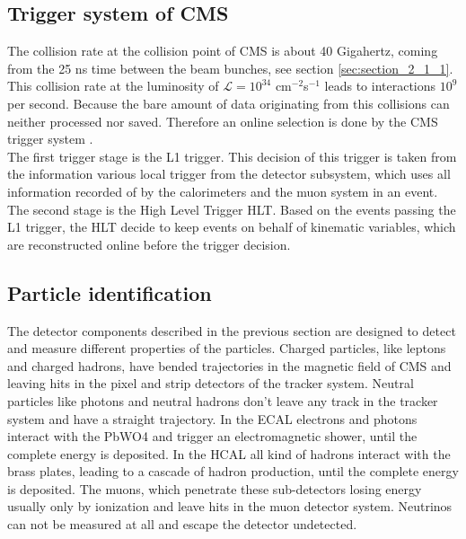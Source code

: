 \subsection{Trigger system of \gls{CMS}}
\label{sec:section_2_2_3}

The collision rate at the collision point of \gls{CMS} is about 40 Gigahertz, coming from the 25 ns time between the beam bunches, see section \ref{sec:section_2_1_1}. This collision rate at the luminosity of $\mathcal{L} = 10^{34}$ cm$^{-2}$s$^{-1}$  leads to interactions $10^9$ per second. Because the bare amount of data originating from this collisions can neither processed nor saved. Therefore an online selection is done by the \gls{CMS} trigger system \cite{CMS2, TRIGGER}. \\

The first trigger stage is the L1 trigger. This decision of this trigger is taken from the information various local trigger from the detector subsystem, which uses all information recorded of by the calorimeters and the muon system in an event. The second stage is the High Level Trigger \gls{HLT}. Based on the events passing the L1 trigger, the \gls{HLT} decide to keep events on behalf of kinematic variables, which are reconstructed online before the trigger decision. 

\subsection{Particle identification}
\label{sec:section_2_2_4}

The detector components described in the previous section are designed to detect and measure different properties of the particles. Charged particles, like leptons and charged hadrons, have bended trajectories in the magnetic field of \gls{CMS} and leaving hits in the pixel and strip detectors of the tracker system. Neutral particles like photons and neutral hadrons don't leave any track in the tracker system and have a straight trajectory. In the \gls{ECAL} electrons and photons interact with the \gls{PbWO4} and trigger an electromagnetic shower, until the complete energy is deposited. In the \gls{HCAL} all kind of hadrons interact with the brass plates, leading to a cascade of hadron production, until the complete energy is deposited. The muons, which penetrate these sub-detectors losing energy usually only by ionization and leave hits in the muon detector system. Neutrinos can not be measured at all and escape the detector undetected. \\

